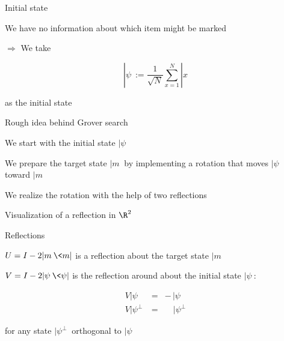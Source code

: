 \begin{frame}{Initial state}

We have no information about which item might be marked

\bigskip
$\Rightarrow$ We take

\[
|\psi\> := \frac{1}{\sqrt N} \sum_{x=1}^N |x\>
\]

as the initial state

\end{frame}





\begin{frame}{Rough idea behind Grover search}

We start with the initial state $|\psi\>$

\bigskip
We prepare the target state $|m\>$ by implementing a rotation that moves $|\psi\>$ toward $|m\>$

\bigskip
We realize the rotation with the help of two reflections

\end{frame}




\begin{frame}{Visualization of a reflection in $\R^2$}

\begin{center}
\end{center}

\end{frame}




\begin{frame}{Reflections}

$U=I-2|m\>\<m|$ is a reflection about the target state $|m\>$

\bigskip
$V=I-2|\psi\>\<\psi|$ is the reflection around about the initial state $|\psi\>$:

\begin{eqnarray*}
V |\psi\>       & = & -   \, |\psi\> \\
V |\psi^\perp\> & = &  \quad |\psi^\perp\>
\end{eqnarray*}

\bigskip
for any state $|\psi^\perp\>$ orthogonal to $|\psi\>$

\end{frame}

